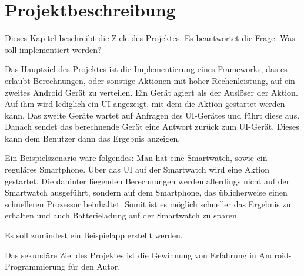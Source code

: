 \chapter{Projektbeschreibung}\label{chap:project}
%
Dieses Kapitel beschreibt die Ziele des Projektes. Es beantwortet die Frage: Was soll implementiert werden?

Das Hauptziel des Projektes ist die Implementierung eines Frameworks, das es erlaubt Berechnungen, oder sonstige Aktionen mit hoher Rechenleistung, auf ein zweites Android Gerät zu verteilen. Ein Gerät agiert als der Auslöser der Aktion. Auf ihm wird lediglich ein UI angezeigt, mit dem die Aktion gestartet werden kann. Das zweite Geräte wartet auf Anfragen des UI-Gerätes und führt diese aus. Danach sendet das berechnende Gerät eine Antwort zurück zum UI-Gerät. Dieses kann dem Benutzer dann das Ergebnis anzeigen.

Ein Beispielszenario wäre folgendes: Man hat eine Smartwatch, sowie ein reguläres Smartphone. Über das UI auf der Smartwatch wird eine Aktion gestartet. Die dahinter liegenden Berechnungen werden allerdings nicht auf der Smartwatch ausgeführt, sondern auf dem Smartphone, das üblicherweise einen schnelleren Prozessor beinhaltet. Somit ist es möglich schneller das Ergebnis zu erhalten und auch Batterieladung auf der Smartwatch zu sparen.

Es soll zumindest ein Beispielapp erstellt werden.

Das sekundäre Ziel des Projektes ist die Gewinnung von Erfahrung in Android-Programmierung für den Autor.
%